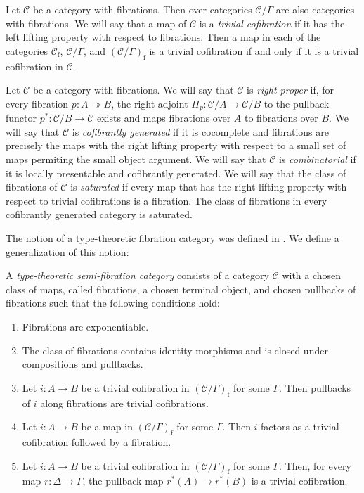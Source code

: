 \documentclass[reqno]{amsart}
\theoremstyle{definition}
\theoremstyle{remark}
\newcommand{\fs}[1]{\mathrm{#1}}
\newcommand{\scat}[1]{\mathcal{#1}}
\numberwithin{figure}{section}
\begin{document}
Let $\scat{C}$ be a category with fibrations.
Then over categories $\scat{C}/\Gamma$ are also categories with fibrations.
We will say that a map of $\scat{C}$ is a \emph{trivial cofibration} if it has the left lifting property with respect to fibrations.
Then a map in each of the categories $\scat{C}_\fs{f}$, $\scat{C}/\Gamma$, and $(\scat{C}/\Gamma)_\fs{f}$ is a trivial cofibration if and only if it is a trivial cofibration in $\scat{C}$.

Let $\scat{C}$ be a category with fibrations.
We will say that $\scat{C}$ is \emph{right proper} if, for every fibration $p : A \twoheadrightarrow B$, the right adjoint $\Pi_p : \scat{C}/A \to \scat{C}/B$ to the pullback functor $p^* : \scat{C}/B \to \scat{C}$ exists and maps fibrations over $A$ to fibrations over $B$.
We will say that $\scat{C}$ is \emph{cofibrantly generated} if it is cocomplete and fibrations are precisely the maps with the right lifting property with respect to a small set of maps permiting the small object argument.
We will say that $\scat{C}$ is \emph{combinatorial} if it is locally presentable and cofibrantly generated.
We will say that the class of fibrations of $\scat{C}$ is \emph{saturated} if every map that has the right lifting property with respect to trivial cofibrations is a fibration.
The class of fibrations in every cofibrantly generated category is saturated.

The notion of a type-theoretic fibration category was defined in \cite[Definition~2.1]{shul-inv}.
We define a generalization of this notion:
\begin{defn}[ttsfc]
A \emph{type-theoretic semi-fibration category} consists of a category $\scat{C}$ with a chosen class of maps, called fibrations, a chosen terminal object, and chosen pullbacks of fibrations such that the following conditions hold:
\begin{enumerate}
\item \label{it:ttsfc-pi} Fibrations are exponentiable.
\item \label{it:ttsfc-fib} The class of fibrations contains identity morphisms and is closed under compositions and pullbacks.
\item Let $i : A \to B$ be a trivial cofibration in $(\scat{C}/\Gamma)_\fs{f}$ for some $\Gamma$.
Then pullbacks of $i$ along fibrations are trivial cofibrations.
\item \label{it:ttsfc-factor} Let $i : A \to B$ be a map in $(\scat{C}/\Gamma)_\fs{f}$ for some $\Gamma$.
Then $i$ factors as a trivial cofibration followed by a fibration.
\item Let $i : A \to B$ be a trivial cofibration in $(\scat{C}/\Gamma)_\fs{f}$ for some $\Gamma$.
Then, for every map $r : \Delta \to \Gamma$, the pullback map $r^*(A) \to r^*(B)$ is a trivial cofibration.
\end{enumerate}
\end{defn}
\end{document}
